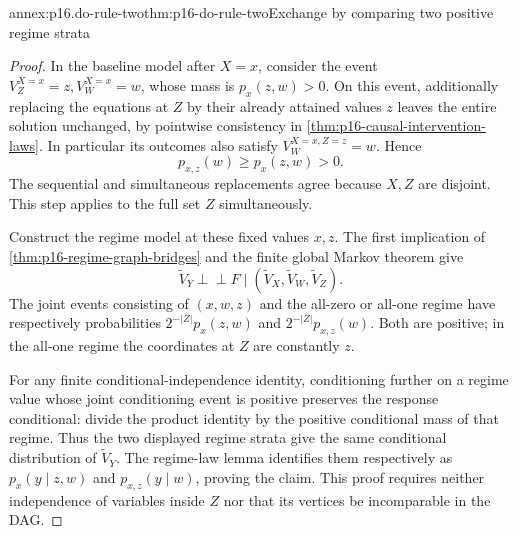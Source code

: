 \begin{annexitem}{annex:p16.do-rule-two}{thm:p16-do-rule-two}{Exchange by comparing two positive regime strata}
\begin{proof}
In the baseline model after \(X=x\), consider the event
\(V_Z^{X=x}=z,V_W^{X=x}=w\), whose mass is \(p_x(z,w)>0\).
On this event, additionally replacing the equations at \(Z\) by
their already attained values \(z\) leaves the entire solution
unchanged, by pointwise consistency in
\cref{thm:p16-causal-intervention-laws}. In particular its outcomes
also satisfy \(V_W^{X=x,Z=z}=w\). Hence
\[
 p_{x,z}(w)\geq p_x(z,w)>0.
\]
The sequential and simultaneous replacements agree because \(X,Z\)
are disjoint. This step applies to the full set \(Z\) simultaneously.

Construct the regime model at these fixed values \(x,z\). The
first implication of \cref{thm:p16-regime-graph-bridges} and the
finite global Markov theorem give
\[
 \widetilde V_Y\mathrel{\perp\!\!\!\perp}F
       \mid(\widetilde V_X,\widetilde V_W,\widetilde V_Z).
\]
The joint events consisting of \((x,w,z)\) and the all-zero or
all-one regime have respectively probabilities
\(2^{-|Z|}p_x(z,w)\) and \(2^{-|Z|}p_{x,z}(w)\).
Both are positive; in the all-one regime the coordinates at \(Z\)
are constantly \(z\).

For any finite conditional-independence identity, conditioning further
on a regime value whose joint conditioning event is positive preserves
the response conditional: divide the product identity by the positive
conditional mass of that regime. Thus the two displayed regime strata
give the same conditional distribution of \(\widetilde V_Y\).
The regime-law lemma identifies them respectively as
\(p_x(y\mid z,w)\) and \(p_{x,z}(y\mid w)\), proving the
claim. This proof requires neither independence of variables inside
\(Z\) nor that its vertices be incomparable in the DAG.
\end{proof}
\end{annexitem}

